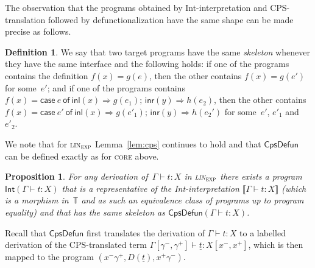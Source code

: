 \documentclass{LMCS}
\theoremstyle{definition}
\newtheorem{definition}[thm]{Definition}
\theoremstyle{plain}
\newtheorem{proposition}[thm]{Proposition}
\newcommand{\kw}[1]{\mathsf{#1}}
\newcommand{\SeqTm}[3]{#1 \vdash #2 \colon #3}
\newcommand{\tcase}[5]{\kw{case}\ #1\ \kw{of}\ \kw{inl}(#2) \Rightarrow #3;\, \kw{inr}(#4) \Rightarrow #5}
\newcommand{\cps}[1]{\underline{#1}}
\newcommand{\TT}{\mathbb{T}}
\newcommand{\sem}[1]{\llbracket #1 \rrbracket}
\newcommand{\semc}[1]{\kw{Int}(#1)}
\newcommand{\linexp}{\textsc{lin}$_\textsc{exp}$\xspace}
\begin{document}
The observation that the programs obtained by Int-interpretation and
CPS-translation followed by defunctionalization have the same shape can be
made precise as follows.
\begin{definition}
  We say that two target programs have the same \emph{skeleton} whenever they
  have the same interface and the
  following holds:
  if one of the programs contains the definition $f(x)=g(e)$, then the other contains $f(x)=g(e')$ 
  for some~$e'$; and if one of the programs contains $f(x)=\tcase e x {g(e_1)} y {h(e_2)}$, then 
  the other contains 
  $f(x)=\tcase {e'} x {g(e'_1)} y {h(e_2')}$
  for some~$e'$, $e'_1$ and $e'_2$. 
\end{definition}

We note that for \linexp Lemma~\ref{lem:cps} 
continues to hold and that $\kw{CpsDefun}$ can be defined 
exactly as for \textsc{core} above.

\begin{proposition}
  \label{prop:skeleton}
  For any derivation of~$\SeqTm{\Gamma}{t}{X}$ in \linexp
  there exists a program $\semc{\SeqTm{\Gamma}{t}{X}}$ that is a representative 
  of the Int-interpretation\/ $\sem{\SeqTm{\Gamma}{t}{X}}$ (which
  is a morphism in~$\TT$ and as such
  an equivalence class of programs up to program equality)
  and that has the same skeleton as $\kw{CpsDefun}(\SeqTm{\Gamma}{t}{X})$.
\end{proposition}
\proof
  Recall that $\kw{CpsDefun}$ first translates the derivation of
  $\SeqTm{\Gamma}{t}{X}$ to a labelled derivation of the
  CPS-translated term 
  $\SeqTm{\Gamma[\gamma^-, \gamma^+]}{\cps t}{X[x^-,x^+]}$,
  which is then mapped to the program
  $(x^-\gamma^+, D(\cps t), x^+\gamma^-)$.
\end{document}
